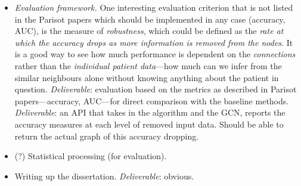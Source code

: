 \documentclass[12pt,a4paper,twoside]{article}
\begin{document}
\begin{itemize}
  \item \textit{Evaluation framework.} One interesting evaluation criterion that is not listed in the Parisot papers which should be implemented in any case (accuracy, AUC), is the measure of \textit{robustness}, which could be defined as the \textit{rate at which the accuracy drops as more information is removed from the nodes}. It is a good way to see how much performance is dependent on the \textit{connections} rather than the \textit{individual patient data}—how much can we infer from the similar neighbours alone without knowing anything about the patient in question. \textit{Deliverable}: evaluation based on the metrics as described in Parisot papers—accuracy, AUC—for direct comparison with the baseline methods. \textit{Deliverable}: an API that takes in the algorithm and the GCN, reports the accuracy measures at each level of removed input data. Should be able to return the actual graph of this accuracy dropping.
  \item (?) Statistical processing (for evaluation).
  \item Writing up the dissertation. \textit{Deliverable}: obvious.
\end{itemize}


\end{document}

